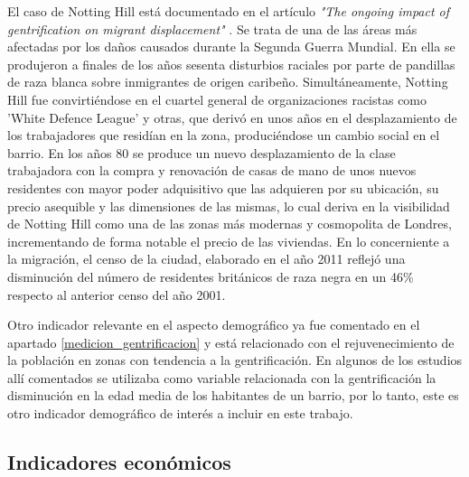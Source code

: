\documentclass[12pt,a4paper,twoside]{book}
\begin{document}
El caso de Notting Hill está documentado en el artículo \textit{"The ongoing impact of gentrification on migrant displacement"} \cite{walawalker_ongoing_2020}. Se trata de una de las áreas más afectadas por los daños causados durante la Segunda Guerra Mundial. En ella se produjeron a finales de los años sesenta disturbios raciales por parte de pandillas de raza blanca sobre inmigrantes de origen caribeño. Simultáneamente, Notting Hill fue convirtiéndose en el cuartel general de organizaciones racistas como 'White Defence League' y otras, que derivó en unos años en el desplazamiento de los trabajadores que residían en la zona, produciéndose un cambio social en el barrio. En los años 80 se produce un nuevo desplazamiento de la clase trabajadora con la compra y renovación de casas de mano de unos nuevos residentes con mayor poder adquisitivo que las adquieren por su ubicación, su precio asequible y las dimensiones de las mismas, lo cual deriva en la visibilidad de Notting Hill como una de las zonas más modernas y cosmopolita de Londres, incrementando de forma notable el precio de las viviendas. En lo concerniente a la migración, el censo de la ciudad, elaborado en el año 2011 reflejó una disminución del número de residentes británicos de raza negra en un 46\% respecto al anterior censo del año 2001.

Otro indicador relevante en el aspecto demográfico ya fue comentado en el apartado \ref{medicion_gentrificacion} y está relacionado con el rejuvenecimiento de la población en zonas con tendencia a la gentrificación. En algunos de los estudios allí comentados se utilizaba como variable relacionada con la gentrificación la disminución en la edad media de los habitantes de un barrio, por lo tanto, este es otro indicador demográfico de interés a incluir en este trabajo.

\subsection{Indicadores económicos} \label{indicadores_economicos}
\end{document}
